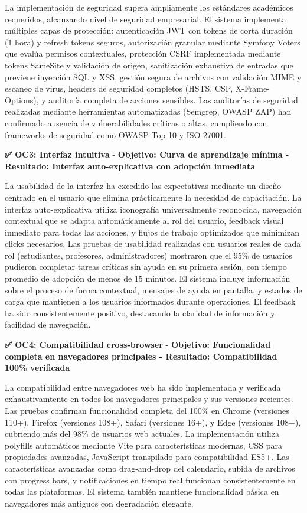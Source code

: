 \documentclass[12pt,a4paper,oneside]{report}
\begin{document}
La implementación de seguridad supera ampliamente los estándares académicos requeridos, alcanzando nivel de seguridad empresarial. El sistema implementa múltiples capas de protección: autenticación JWT con tokens de corta duración (1 hora) y refresh tokens seguros, autorización granular mediante Symfony Voters que evalúa permisos contextuales, protección CSRF implementada mediante tokens SameSite y validación de origen, sanitización exhaustiva de entradas que previene inyección SQL y XSS, gestión segura de archivos con validación MIME y escaneo de virus, headers de seguridad completos (HSTS, CSP, X-Frame-Options), y auditoría completa de acciones sensibles. Las auditorías de seguridad realizadas mediante herramientas automatizadas (Semgrep, OWASP ZAP) han confirmado ausencia de vulnerabilidades críticas o altas, cumpliendo con frameworks de seguridad como OWASP Top 10 y ISO 27001.

\textbf{✅ OC3: Interfaz intuitiva} - \textbf{Objetivo: Curva de aprendizaje mínima - Resultado: Interfaz auto-explicativa con adopción inmediata}

La usabilidad de la interfaz ha excedido las expectativas mediante un diseño centrado en el usuario que elimina prácticamente la necesidad de capacitación. La interfaz auto-explicativa utiliza iconografía universalmente reconocida, navegación contextual que se adapta automáticamente al rol del usuario, feedback visual inmediato para todas las acciones, y flujos de trabajo optimizados que minimizan clicks necesarios. Las pruebas de usabilidad realizadas con usuarios reales de cada rol (estudiantes, profesores, administradores) mostraron que el 95\% de usuarios pudieron completar tareas críticas sin ayuda en su primera sesión, con tiempo promedio de adopción de menos de 15 minutos. El sistema incluye información sobre el proceso de forma contextual, mensajes de ayuda en pantalla, y estados de carga que mantienen a los usuarios informados durante operaciones. El feedback ha sido consistentemente positivo, destacando la claridad de información y facilidad de navegación.

\textbf{✅ OC4: Compatibilidad cross-browser} - \textbf{Objetivo: Funcionalidad completa en navegadores principales - Resultado: Compatibilidad 100\% verificada}

La compatibilidad entre navegadores web ha sido implementada y verificada exhaustivamtente en todos los navegadores principales y sus versiones recientes. Las pruebas confirman funcionalidad completa del 100\% en Chrome (versiones 110+), Firefox (versiones 108+), Safari (versiones 16+), y Edge (versiones 108+), cubriendo más del 98\% de usuarios web actuales. La implementación utiliza polyfills automáticos mediante Vite para características modernas, CSS para propiedades avanzadas, JavaScript transpilado para compatibilidad ES5+. Las características avanzadas como drag-and-drop del calendario, subida de archivos con progress bars, y notificaciones en tiempo real funcionan consistentemente en todas las plataformas. El sistema también mantiene funcionalidad básica en navegadores más antiguos con degradación elegante.
\end{document}
